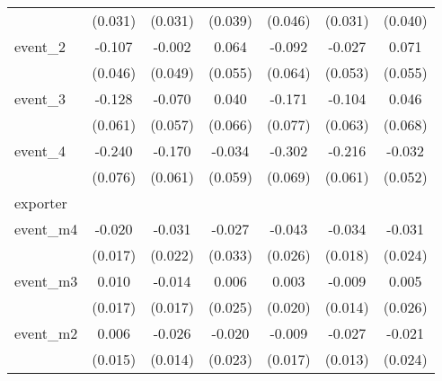 {\begin{tabular}{l*{6}{c}}
            &     (0.031)         &     (0.031)         &     (0.039)         &     (0.046)         &     (0.031)         &     (0.040)         \\
[1em]
event\_2     &      -0.107\sym{*}  &      -0.002         &       0.064         &      -0.092         &      -0.027         &       0.071         \\
            &     (0.046)         &     (0.049)         &     (0.055)         &     (0.064)         &     (0.053)         &     (0.055)         \\
[1em]
event\_3     &      -0.128\sym{*}  &      -0.070         &       0.040         &      -0.171\sym{*}  &      -0.104         &       0.046         \\
            &     (0.061)         &     (0.057)         &     (0.066)         &     (0.077)         &     (0.063)         &     (0.068)         \\
[1em]
event\_4     &      -0.240\sym{**} &      -0.170\sym{**} &      -0.034         &      -0.302\sym{***}&      -0.216\sym{***}&      -0.032         \\
            &     (0.076)         &     (0.061)         &     (0.059)         &     (0.069)         &     (0.061)         &     (0.052)         \\
\hline
exporter    &                     &                     &                     &                     &                     &                     \\
event\_m4    &      -0.020         &      -0.031         &      -0.027         &      -0.043         &      -0.034         &      -0.031         \\
            &     (0.017)         &     (0.022)         &     (0.033)         &     (0.026)         &     (0.018)         &     (0.024)         \\
[1em]
event\_m3    &       0.010         &      -0.014         &       0.006         &       0.003         &      -0.009         &       0.005         \\
            &     (0.017)         &     (0.017)         &     (0.025)         &     (0.020)         &     (0.014)         &     (0.026)         \\
[1em]
event\_m2    &       0.006         &      -0.026         &      -0.020         &      -0.009         &      -0.027\sym{*}  &      -0.021         \\
            &     (0.015)         &     (0.014)         &     (0.023)         &     (0.017)         &     (0.013)         &     (0.024)         \\

\end{tabular}}
